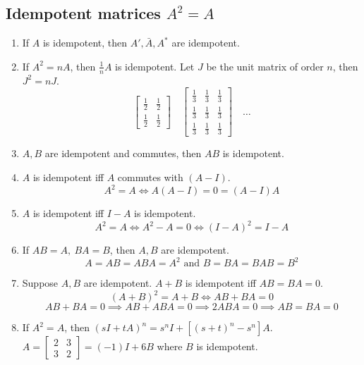 \subsection{Idempotent matrices $A^2 = A$}
\begin{enumerate}
	\item If $A$ is idempotent, then $A',\bar{A},A^\ast$ are idempotent.
	\item If $A^2 = nA$, then $\frac{1}{n}A$ is idempotent.
		\subitem Let $J$ be the unit matrix of order $n$, then $J^2 = nJ$.
	$$\begin{bmatrix}\frac{1}{2} & \frac{1}{2} \\ \frac{1}{2} & \frac{1}{2} \end{bmatrix} \quad \begin{bmatrix}\frac{1}{3} & \frac{1}{3} & \frac{1}{3} \\ \frac{1}{3} & \frac{1}{3} & \frac{1}{3} \\ \frac{1}{3} & \frac{1}{3} & \frac{1}{3} \end{bmatrix} \quad \dots $$
	\item $A,B$ are idempotent and commutes, then $AB$ is idempotent.
	\item $A$ is idempotent iff $A$ commutes with $(A-I)$.  $$A^2 = A \iff A(A-I)= 0 = (A-I)A$$
	\item $A$ is idempotent iff $I-A$ is idempotent.
		$$A^2 = A \iff A^2-A = 0 \iff (I-A)^2=I-A$$
	\item If $AB=A,\ BA=B$, then $A,B$ are idempotent.
		$$ A = AB = ABA = A^2 \text{ and } B = BA = BAB = B^2 $$
	\item Suppose $A,B$ are idempotent. $A+B$ is idempotent iff $AB=BA=0$.
		$$ (A+B)^2 = A+B \iff AB+BA = 0 $$
		$$ AB+BA = 0 \implies AB + ABA = 0 \implies 2ABA = 0 \implies AB = BA = 0$$
	\item If $A^2 = A$, then $(sI+tA)^n = s^nI + [(s+t)^n-s^n]A$.
		\subitem $ A = \begin{bmatrix} 2 & 3 \\ 3 & 2 \end{bmatrix} = (-1)I+6B $ where $B$ is idempotent.
\end{enumerate}

